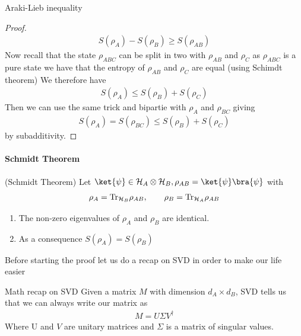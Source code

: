 \begin{parag}{Araki-Lieb inequality}
\begin{proof}
	\begin{align*} 
		S\left(\rho_A\right) - S\left(\rho_B\right) \geq S\left(\rho_{AB}\right) 
	\end{align*}
	Now recall that the state $\rho_{ABC}$ can be split in two with $\rho_{AB}$ and $\rho_C$ as $\rho_{ABC}$ is a pure state we have that the entropy of $\rho_{AB}$ and $\rho_C$ are equal (using Schimdt theorem) We therefore have 
	\begin{align*} 
		S\left(\rho_A\right) \leq S\left(\rho_B\right) + S\left(\rho_C\right) 
	\end{align*}
	Then we can use the same trick and bipartie with $\rho_A$ and $\rho_{BC}$ giving 
	\begin{align*} 
		S\left(\rho_A\right) = S\left(\rho_{BC}\right)  \leq S\left(\rho_B\right) + S\left(\rho_C\right)
	\end{align*}
	by subadditivity.
	\end{proof}
	
\end{parag}


\paragraph{Schmidt Theorem}%
\label{par:Schmidt Theorem}

\begin{theoreme}{(Schmidt Theorem)}
Let $\ket{\psi} \in \mathcal{H}_A \otimes \mathcal{H}_B, \rho_{AB} =  \ket{\psi}\bra{\psi}$ with 
\begin{align*} 
	 \rho_A = \text{Tr}_{\mathcal{H}_B} \rho_{AB}, \quad\quad \rho_B =  \text{Tr}_{\mathcal{H}_A}\rho_{AB}
\end{align*}
\begin{enumerate}
    \item The non-zero eigenvalues of $\rho_A$ and $\rho_B$ are identical.
    \item As a consequence $S\left(\rho_A\right) = S\left(\rho_B\right)$
\end{enumerate}

\end{theoreme}
Before starting the proof let us do a recap on SVD in order to make our life easier
\begin{parag}{Math recap on SVD}
    Given a matrix $M$ with dimension $d_A \times d_B$, SVD tells us that we can always write our matrix as 
	\begin{align*} 
		M= U \Sigma V^{\dagger} 
	\end{align*}
	Where U and $V$ are unitary matrices and $\Sigma$ is a matrix of singular values.
\end{parag}



